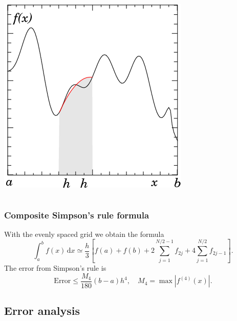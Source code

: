 \documentclass{beamer}
\begin{document}
\begin{frame}
\begin{columns}
\begin{column}{0.5\textwidth}
\begin{overlayarea}{\textwidth}{0.7\textheight}
{\begin{center}
            \includegraphics[width=\textwidth]{figures/simpson2}
          \end{center}
        }
      \end{overlayarea}
    \end{column}
  \end{columns}

\end{frame}

\begin{frame}
  \frametitle{Composite Simpson's rule formula}

  With the evenly spaced grid we obtain the formula
  \begin{equation*}
    \int_a^b f(x) \, \text{d}x \simeq \frac{h}{3} \left[ f(a) + f(b) +
      2 \sum_{j=1}^{N/2 - 1} f_{2 j} + 4 \sum_{j=1}^{N/2} f_{2 j - 1}
    \right].
  \end{equation*}
  The error from Simpson's rule is
  \begin{equation*}
    \text{Error} \leq \frac{M_4}{180} ( b - a ) h^4, \quad M_4 = \max
    | f^{(4)} (x) |.
  \end{equation*}

\end{frame}


\subsection{Error analysis}
\end{document}
